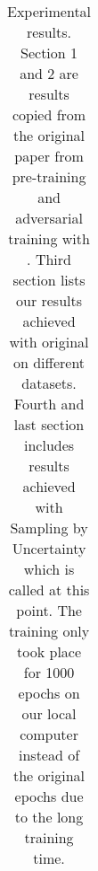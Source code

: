 \begin{table}[h]
\begin{tabular}{lllllll}
        \bottomrule
    \end{tabular}
    \caption{Experimental results.
    Section 1 and 2 are results copied from the original paper \cite{cai2017kbgan} from pre-training and adversarial training with \kbgan. 
    Third section lists our results achieved with original \kbgan on different datasets.
    Fourth and last section includes results achieved with Sampling by Uncertainty which is called \ucgan at this point.
    The training only took place for 1000 epochs on our local computer instead of the original  epochs due to the long training time.}
\label{tab:results}
\end{table}